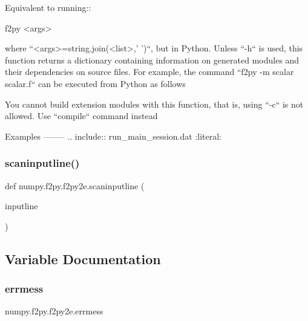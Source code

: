 \begin{DoxyVerb}Equivalent to running::

    f2py <args>

where ``<args>=string.join(<list>,' ')``, but in Python.  Unless
``-h`` is used, this function returns a dictionary containing
information on generated modules and their dependencies on source
files.  For example, the command ``f2py -m scalar scalar.f`` can be
executed from Python as follows

You cannot build extension modules with this function, that is,
using ``-c`` is not allowed. Use ``compile`` command instead

Examples
--------
.. include:: run_main_session.dat
    :literal:\end{DoxyVerb}
 \mbox{\label{namespacenumpy_1_1f2py_1_1f2py2e_a827c2fe95ae3ccb72d439b94d742d68e}} 
\subsubsection{\texorpdfstring{scaninputline()}{scaninputline()}}
{\footnotesize\ttfamily def numpy.\+f2py.\+f2py2e.\+scaninputline (\begin{DoxyParamCaption}\item[{}]{inputline }\end{DoxyParamCaption})}



\subsection{Variable Documentation}
\mbox{\label{namespacenumpy_1_1f2py_1_1f2py2e_a334da0912173f2789d7c88633b70d73d}} 
\subsubsection{\texorpdfstring{errmess}{errmess}}
{\footnotesize\ttfamily numpy.\+f2py.\+f2py2e.\+errmess}

\mbox{\label{namespacenumpy_1_1f2py_1_1f2py2e_a7a871c21a5526bb1643ac355df17b8bc}} 
